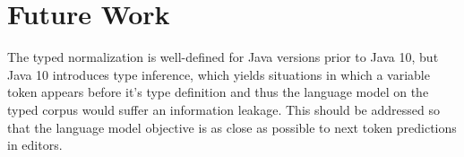 \documentclass[11pt]{article}
\begin{document}
\section{Future Work}
The typed normalization is well-defined for Java versions prior to Java 10, but Java 10 introduces type inference, which yields situations in which a variable token appears before it's type definition and thus the language model on the typed corpus would suffer an information leakage. This should be addressed so that the language model objective is as close as possible to next token predictions in editors.




\end{document}
